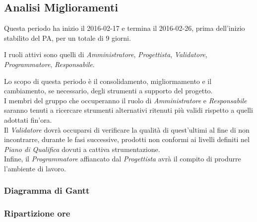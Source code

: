 \subsection{Analisi Miglioramenti}
Questa periodo ha inizio il 2016-02-17 e termina il 2016-02-26, prima dell'inizio stabilito del PA, per un totale di 9 giorni.


I ruoli attivi sono quelli di \textit{Amministratore}, \textit{Progettista}, \textit{Validatore}, \textit{Programmatore}, \textit{Responsabile}.


Lo scopo di questa periodo \`e il consolidamento, migliormamento e il cambiamento, se necessario, degli strumenti a supporto del progetto.\\
I membri del gruppo che occuperanno il ruolo di \textit{Amministratore} e \textit{Responsabile} saranno tenuti a ricercare strumenti alternativi ritenuti pi\`u validi rispetto a quelli adottati fin'ora.\\
Il \textit{Validatore} dovr\`a occuparsi di verificare la qualit\`a di quest'ultimi al fine di non incontrarre, durante le fasi successive, prodotti non conformi ai livelli definiti nel \textit{Piano di Qualifica} dovuti a cattiva strumentazione.\\
Infine, il \textit{Programmatore} affiancato dal \textit{Progettista} avr\`a il compito di produrre l'ambiente di lavoro.

\subsubsection{Diagramma di Gantt}

\subsubsection{Ripartizione ore}

